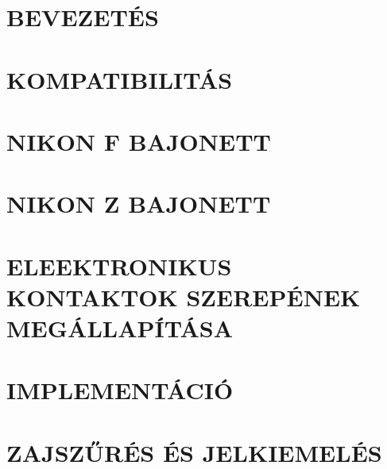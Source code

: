 









%
%
%
%


\newpage
\tableofcontents
\newpage





\clearpage
\section{BEVEZETÉS}

\clearpage
\section{KOMPATIBILITÁS}

\clearpage
\section{NIKON F BAJONETT}

\clearpage
\section{NIKON Z BAJONETT}

\clearpage
\section{ELEEKTRONIKUS KONTAKTOK SZEREPÉNEK MEGÁLLAPÍTÁSA}

\clearpage
\section{IMPLEMENTÁCIÓ}

\clearpage
\section{ZAJSZŰRÉS ÉS JELKIEMELÉS}


